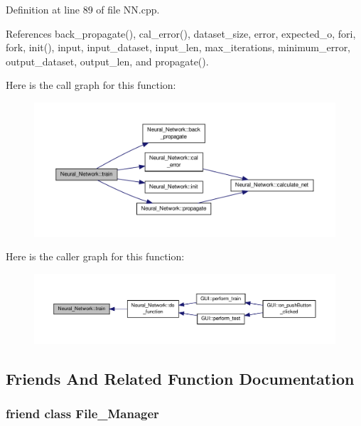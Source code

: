 Definition at line 89 of file N\-N.\-cpp.



References back\-\_\-propagate(), cal\-\_\-error(), dataset\-\_\-size, error, expected\-\_\-o, fori, fork, init(), input, input\-\_\-dataset, input\-\_\-len, max\-\_\-iterations, minimum\-\_\-error, output\-\_\-dataset, output\-\_\-len, and propagate().



Here is the call graph for this function\-:\nopagebreak
\begin{figure}[H]
\begin{center}
\leavevmode
\includegraphics[width=350pt]{d1/d7c/a00003_a033f4f60812c0359cc50815e957f11f7_cgraph}
\end{center}
\end{figure}




Here is the caller graph for this function\-:\nopagebreak
\begin{figure}[H]
\begin{center}
\leavevmode
\includegraphics[width=350pt]{d1/d7c/a00003_a033f4f60812c0359cc50815e957f11f7_icgraph}
\end{center}
\end{figure}




\subsection{Friends And Related Function Documentation}
\hypertarget{a00003_a96aa84fcda6b19a74fff9d19c16b07fe}{
\subsubsection[{File\-\_\-\-Manager}]{\setlength{\rightskip}{0pt plus 5cm}friend class {\bf File\-\_\-\-Manager}\hspace{0.3cm}{\ttfamily [friend]}}}\label{d1/d7c/a00003_a96aa84fcda6b19a74fff9d19c16b07fe}


